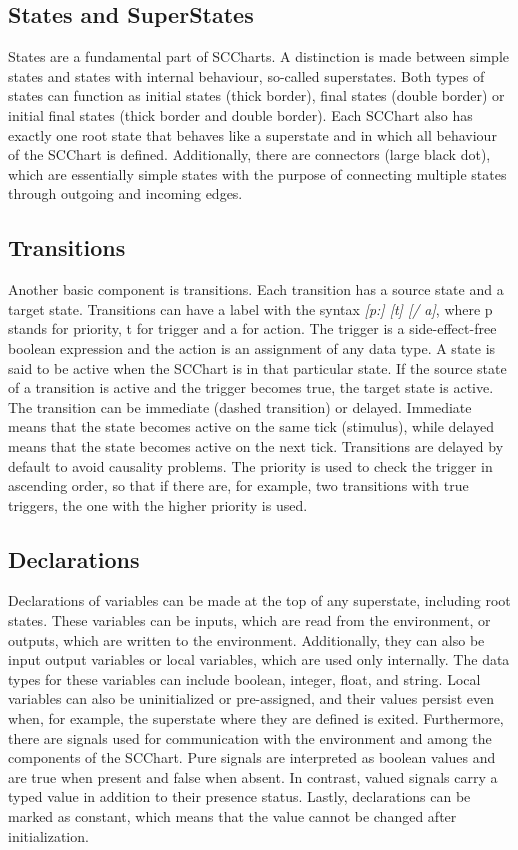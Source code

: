 \subsection{States and SuperStates}
States are a fundamental part of SCCharts. A distinction is made between simple states and states with internal behaviour, so-called superstates. Both types of states can function as initial states (thick border), final states (double border) or initial final states (thick border and double border). Each SCChart also has exactly one root state that behaves like a superstate and in which all behaviour of the SCChart is defined. Additionally, there are connectors (large black dot), which are essentially simple states with the purpose of connecting multiple states through outgoing and incoming edges.
\subsection{Transitions}
Another basic component is transitions. Each transition has a source state and a target state. Transitions can have a label with the syntax \textit{[p:] [t] [/ a]}, where p stands for priority, t for trigger and a for action. The trigger is a side-effect-free boolean expression and the action is an assignment of any data type. A state is said to be active when the SCChart is in that particular state. If the source state of a transition is active and the trigger becomes true, the target state is active. The transition can be immediate (dashed transition) or delayed. Immediate means that the state becomes active on the same tick (stimulus), while delayed means that the state becomes active on the next tick. Transitions are delayed by default to avoid causality problems. The priority is used to check the trigger in ascending order, so that if there are, for example, two transitions with true triggers, the one with the higher priority is used.~\cite{Motika.2017}
\subsection{Declarations}
Declarations of variables can be made at the top of any superstate, including root states. These variables can be inputs, which are read from the environment, or outputs, which are written to the environment. Additionally, they can also be input output variables or local variables, which are used only internally. The data types for these variables can include boolean, integer, float, and string. Local variables can also be uninitialized or pre-assigned, and their values persist even when, for example, the superstate where they are defined is exited. Furthermore, there are signals used for communication with the environment and among the components of the SCChart. Pure signals are interpreted as boolean values and are true when present and false when absent. In contrast, valued signals carry a typed value in addition to their presence status. Lastly, declarations can be marked as constant, which means that the value cannot be changed after initialization.~\cite{Motika.2017}
